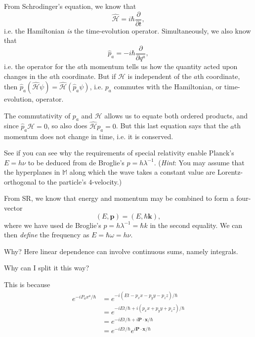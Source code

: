 \documentclass[../road-to-reality.tex]{subfiles}
\begin{document}
\begin{questions}
  \begin{solution}
    From Schrodinger's equation, we know that
    \[
      \hat{\mathcal{H}} = i\hbar\frac{\partial}{\partial{t}},
    \]
    i.e. the Hamiltonian \textit{is} the time-evolution operator.
    Simultaneously, we also know that
    \[
      \hat{p}_a = -i\hbar\frac{\partial}{\partial{q}^a},
    \]
    i.e. the operator for the $a$th momentum tells us how the quantity acted
    upon changes in the $a$th coordinate. But if $\mathcal{H}$ is independent of
    the $a$th coordinate, then
    $\hat{p}_a(\hat{\mathcal{H}}\psi)=\hat{\mathcal{H}}(\hat{p}_a\psi)$, i.e. $p_a$ commutes
    with the Hamiltonian, or time-evolution, operator.

    The commutativity of $p_a$ and $\mathcal{H}$ allows us to equate both
    ordered products, and since $\hat{p}_a\mathcal{H} = 0$, so also does
    $\hat{\mathcal{H}}p_a=0$. But this last equation says that the $a$th
    momentum does not change in time, i.e. it is conserved.
  \end{solution}

\question See if you can see why the requirements of special relativity enable
  Planck's $E=h\nu$ to be deduced from de Broglie's $p=h\lambda^{-1}$.
  (\textit{Hint}: You may assume that the hyperplanes in $\mathbb{M}$ along which
  the wave takes a constant value are Lorentz-orthogonal to the particle's $4$-velocity.)
  
  \begin{solution}
  	From SR, we know that energy and momentum may be combined to form a four-vector 
  	\[
  		(E, \mathbf{p}) = (E, \hbar\mathbf{k}),
  	\]
  	where we have used de Broglie's $p = h\lambda^{-1} = \hbar{k}$ in the second equality. We can then \textit{define} the frequency as $E = \hbar\omega = h\nu$. 
 	\end{solution}
  
\question Why? Here linear dependence can involve continuous sums, namely integrals.

\question Why can I split it this way?

\begin{solution}
	This is because
	\begin{align*}
		e^{-iP_ax^a/\hbar} &= e^{-i(Et - p_xx - p_yy - p_zz)/\hbar} \\
		&= e^{-iEt/\hbar + i(p_xx + p_yy + p_zz)/\hbar} \\
		&= e^{-iEt/\hbar + i\mathbf{P}\cdot\mathbf{x}/\hbar} \\
		&= e^{-iEt/\hbar}e^{i\mathbf{P}\cdot\mathbf{x}/\hbar}
	\end{align*}
\end{solution}


\end{questions}
\end{document}
